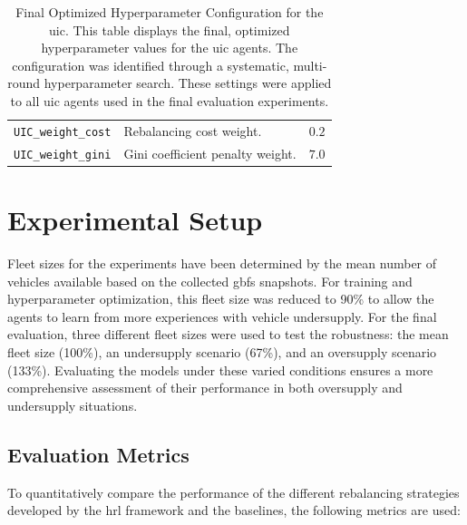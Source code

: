 \begin{table}[!htb]
\begin{tabularx}{\textwidth}{lXl}
        \texttt{UIC\_weight\_cost}          & Rebalancing cost weight.                   & $0.2$ \\
        \texttt{UIC\_weight\_gini}          & Gini coefficient penalty weight.                 & $7.0$ \\
        \bottomrule
    \end{tabularx}
    \caption{Final Optimized Hyperparameter Configuration for the \gls{uic}. This table displays the final, optimized hyperparameter values for the \gls{uic} agents. The configuration was identified through a systematic, multi-round hyperparameter search. These settings were applied to all \gls{uic} agents used in the final evaluation experiments.}
    \label{tab:uic_final_hyperparameters}
\end{table}

\section{Experimental Setup}\label{sec:evaluation-setup}
Fleet sizes for the experiments have been determined by the mean number of vehicles available based on the collected \gls{gbfs} snapshots.
For training and hyperparameter optimization, this fleet size was reduced to 90\% to allow the agents to learn from more experiences with vehicle undersupply.
For the final evaluation, three different fleet sizes were used to test the robustness: the mean fleet size (100\%), an undersupply scenario (67\%), and an oversupply scenario (133\%).
Evaluating the models under these varied conditions ensures a more comprehensive assessment of their performance in both oversupply and undersupply situations.


\subsection{Evaluation Metrics}\label{sec:evaluation-setup-metrics}
To quantitatively compare the performance of the different rebalancing strategies developed by the \gls{hrl} framework and the baselines, the following metrics are used:

